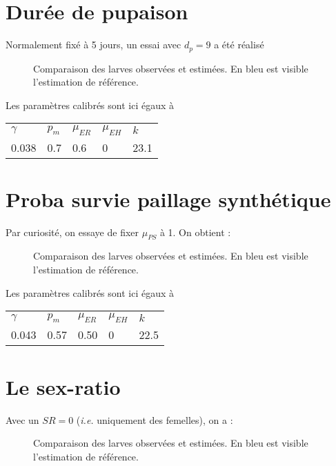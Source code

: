 \documentclass[a4paper, 11pt]{article}
\begin{document}
\newpage
\section{Durée de pupaison}

Normalement fixé à 5 jours, un essai avec $d_p = 9$ a été réalisé

\begin{figure}[h]
 \centering
 \caption{Comparaison des larves observées et estimées. En bleu est visible l'estimation de référence.}
\end{figure}

Les paramètres calibrés sont ici égaux à 

\begin{center}
\begin{tabular}{lllll}
$\gamma$ & $p_m$ & $\mu_{ER}$ & $\mu_{EH}$ & $k$\\
0.038 & 0.7 & 0.6 & 0 & 23.1
\end{tabular}
\end{center}

\newpage
\section{Proba survie paillage synthétique}

Par curiosité, on essaye de fixer $\mu_{PS}$ à 1. On obtient :

\begin{figure}[h]
 \centering
 \caption{Comparaison des larves observées et estimées. En bleu est visible l'estimation de référence.}
\end{figure}

Les paramètres calibrés sont ici égaux à 

\begin{center}
\begin{tabular}{lllll}
$\gamma$ & $p_m$ & $\mu_{ER}$ & $\mu_{EH}$ & $k$\\
0.043 & 0.57 & 0.50 & 0 & 22.5
\end{tabular}
\end{center}


\newpage
\section{Le sex-ratio}

Avec un $SR = 0$ (\textit{i.e.} uniquement des femelles), on a :
\begin{figure}[h]
 \centering
 \caption{Comparaison des larves observées et estimées. En bleu est visible l'estimation de référence.}
\end{figure}
\end{document}
